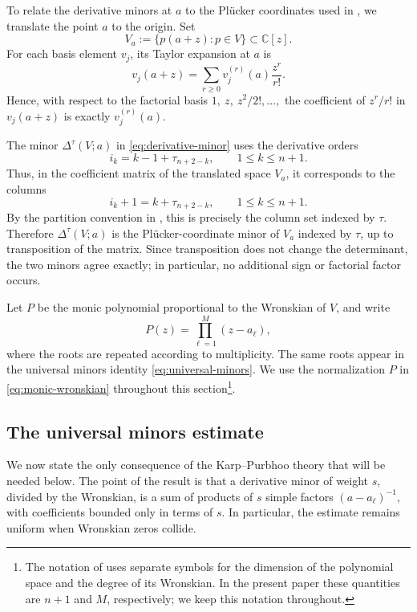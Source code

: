 \documentclass[12pt,letterpaper,reqno]{amsart}
\theoremstyle{definition}
\numberwithin{equation}{section}
\newcommand{\C}{\mathbb C}
\begin{document}
To relate the derivative minors at \(a\) to the Pl\"ucker coordinates
used in \cite{KP26}, we translate the point \(a\) to the origin. Set
\[
V_a:=\{p(a+z):p\in V\}\subset\C[z].
\]
For each basis element \(v_j\), its Taylor expansion at \(a\) is
\[
v_j(a+z)
=
\sum_{r\geq0}v_j^{(r)}(a)\frac{z^r}{r!}.
\]
Hence, with respect to the factorial basis
$
1,\ z,\ {z^2}/{2!},\ldots,
$
the coefficient of \(z^r/r!\) in \(v_j(a+z)\) is exactly
\(v_j^{(r)}(a)\).

The minor \(\Delta^\tau(V;a)\) in
\eqref{eq:derivative-minor} uses the derivative orders
\[
i_k=k-1+\tau_{n+2-k},
\qquad 1\leq k\leq n+1.
\]
Thus, in the coefficient matrix of the translated space \(V_a\), it
corresponds to the columns
\[
i_k+1=k+\tau_{n+2-k},
\qquad 1\leq k\leq n+1.
\]
By the partition convention in \cite[equation~(2.5)]{KP26}, this is
precisely the column set indexed by \(\tau\). Therefore
\(\Delta^\tau(V;a)\) is the Pl\"ucker-coordinate minor of \(V_a\)
indexed by \(\tau\), up to transposition of the matrix. Since
transposition does not change the determinant, the two minors agree
exactly; in particular, no additional sign or factorial factor occurs.

Let \(P\) be the monic polynomial proportional to the Wronskian of
\(V\), and write
\begin{equation}\label{eq:monic-wronskian}
 P(z)=\prod_{\ell=1}^M(z-a_\ell),
\end{equation}
where the roots are repeated according to multiplicity. The same roots
appear in the universal minors identity \eqref{eq:universal-minors}.
We use the normalization \(P\) in \eqref{eq:monic-wronskian}
throughout this section\footnote{The notation of \cite{KP26} uses separate symbols for the dimension of
the polynomial space and the degree of its Wronskian. In the present
paper these quantities are \(n+1\) and \(M\), respectively; we keep this
notation throughout.}.




\subsection{The universal minors estimate}
\label{sec:universal-minors}

We now state the only consequence of the Karp--Purbhoo theory that will
be needed below. The point of the result is that a derivative minor of
weight \(s\), divided by the Wronskian, is a sum of products of \(s\)
simple factors \((a-a_\ell)^{-1}\), with coefficients bounded only in
terms of \(s\). In particular, the estimate remains uniform when
Wronskian zeros collide.
\end{document}
